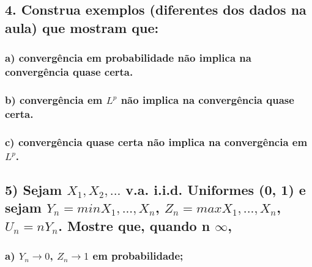\documentclass[portuguese]{article}
\begin{document}
\subsection*{\textcompwordmark{}}


\subsection*{\textmd{4. Construa exemplos (diferentes dos dados na aula) que mostram
que: }}


\subsubsection*{\textmd{a) convergência em probabilidade não implica na convergência
quase certa.}}


\subsubsection*{\textmd{b) convergência em $L^{p}$ não implica na convergência quase
certa.}}


\subsubsection*{\textmd{c) convergência quase certa não implica na convergência em
$L^{p}$.}}


\subsection*{\textcompwordmark{}}


\subsection*{\textmd{5) Sejam $X_{1},X_{2},...$ v.a. i.i.d. Uniformes (0, 1)
e sejam $Y_{n}=min{X_{1},...,X_{n}}$, $Z_{n}=max{X_{1},...,X_{n}}$,
$U_{n}=nY_{n}$. Mostre que, quando n \textrightarrow{} \ensuremath{\infty},}}


\subsubsection*{\textmd{a) $Y_{n}\rightarrow0$, $Z_{n}\rightarrow1$ em probabilidade;}}
\end{document}
